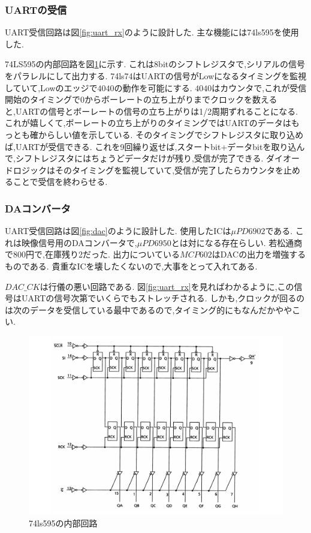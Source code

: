 \documentclass[a4paper,10pt]{article}
\begin{document}
\begin{multicols}{2}[\raggedcolumns]
\subsubsection{UARTの受信}
UART受信回路は図\ref{fig:uart_rx}のように設計した.
主な機能には74ls595を使用した.

74LS595の内部回路を図\ref{fig:74595}に示す.
これは8bitのシフトレジスタで,シリアルの信号をパラレルにして出力する.
74ls74はUARTの信号がLowになるタイミングを監視していて,Lowのエッジで$4040$の動作を可能にする.
$4040$はカウンタで,これが受信開始のタイミングで0からボーレートの立ち上がりまでクロックを数えると,UARTの信号とボーレートの信号の立ち上がりは1/2周期ずれることになる.
これが嬉しくて,ボーレートの立ち上がりのタイミングではUARTのデータはもっとも確からしい値を示している.
そのタイミングでシフトレジスタに取り込めば,UARTが受信できる.
これを9回繰り返せば,スタートbit+データbitを取り込んで,シフトレジスタにはちょうどデータだけが残り,受信が完了できる.
ダイオードロジックはそのタイミングを監視していて,受信が完了したらカウンタを止めることで受信を終わらせる.

\subsubsection{DAコンバータ}
UART受信回路は図\ref{fig:dac}のように設計した.
使用したICは$\mu PD6902$である.
これは映像信号用のDAコンバータで,$\mu PD6950$とは対になる存在らしい.
若松通商で800円で,在庫残り2だった.
出力についている$MCP602$はDACの出力を増強するものである.
貴重なICを壊したくないので,大事をとって入れてある.

$DAC\_CK$は行儀の悪い回路である.
図\ref{fig:uart_rx}を見ればわかるように,この信号はUARTの信号次第でいくらでもストレッチされる.
しかも,クロックが回るのは次のデータを受信している最中であるので,タイミング的にもなんだかややこい.

\begin{figure}[H]
    \centering
    \includegraphics[width=\linewidth]{figure/74595.png} 
    \caption{74ls595の内部回路} 
    \label{fig:74595}
\end{figure}


\end{multicols}
\end{document}
